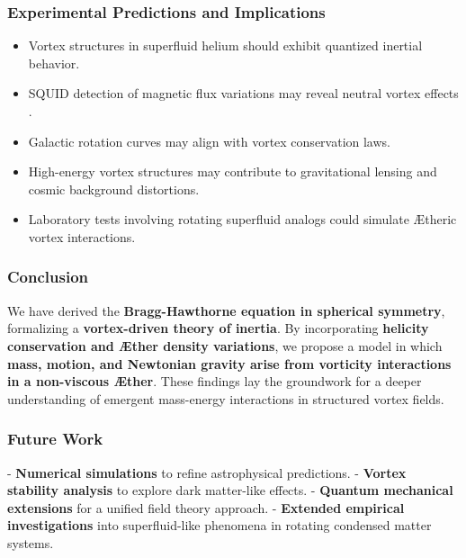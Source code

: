 \subsubsection*{Experimental Predictions and Implications}
\begin{itemize}
    \item Vortex structures in superfluid helium should exhibit quantized inertial behavior.
    \item SQUID detection of magnetic flux variations may reveal neutral vortex effects \cite{donnelly1991quantized}.
    \item Galactic rotation curves may align with vortex conservation laws.
    \item High-energy vortex structures may contribute to gravitational lensing and cosmic background distortions.
    \item Laboratory tests involving rotating superfluid analogs could simulate Ætheric vortex interactions.
\end{itemize}

\subsubsection*{Conclusion}
We have derived the \textbf{Bragg-Hawthorne equation in spherical symmetry}, formalizing a \textbf{vortex-driven theory of inertia}. By incorporating \textbf{helicity conservation and Æther density variations}, we propose a model in which \textbf{mass, motion, and Newtonian gravity arise from vorticity interactions in a non-viscous Æther}. These findings lay the groundwork for a deeper understanding of emergent mass-energy interactions in structured vortex fields.

\subsubsection*{Future Work}
- \textbf{Numerical simulations} to refine astrophysical predictions.
- \textbf{Vortex stability analysis} to explore dark matter-like effects.
- \textbf{Quantum mechanical extensions} for a unified field theory approach.
- \textbf{Extended empirical investigations} into superfluid-like phenomena in rotating condensed matter systems.